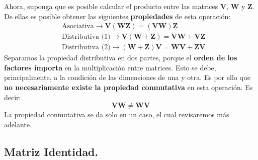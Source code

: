 \documentclass[12pt]{article}
\begin{document}
Ahora, suponga que es posible calcular el producto entre las matrices $\mathbf{V}$, $\mathbf{W}$ y $\mathbf{Z}$. De ellas es posible obtener las siguientes \textbf{propiedades} de esta operación:
\begin{align*}
&\text{Asociativa} \rightarrow \mathbf{V}(\mathbf{W}\mathbf{Z}) = (\mathbf{V}\mathbf{W}) \mathbf{Z} \\
&\text{Distributiva (1)} \rightarrow \mathbf{V} (\mathbf{W} + \mathbf{Z}) = \mathbf{V}\mathbf{W} + \mathbf{V}\mathbf{Z} \\
&\text{Distributiva (2)} \rightarrow (\mathbf{W} + \mathbf{Z}) \mathbf{V} = \mathbf{W}\mathbf{V} + \mathbf{Z}\mathbf{V}
\end{align*}
Separamos la propiedad distributiva en dos partes, porque el \textbf{orden de los factores importa} en la multiplicación entre matrices. Esto se debe, principalmente, a la condición de las dimensiones de una y otra. Es por ello que \textbf{no necesariamente existe la propiedad conmutativa} en esta operación. Es decir:
\[
  \mathbf{V}\mathbf{W} \neq \mathbf{W}\mathbf{V}
\]
La propiedad conmutativa se da solo en un caso, el cual revisaremos más adelante.


\subsection{Matriz Identidad.}
\end{document}
